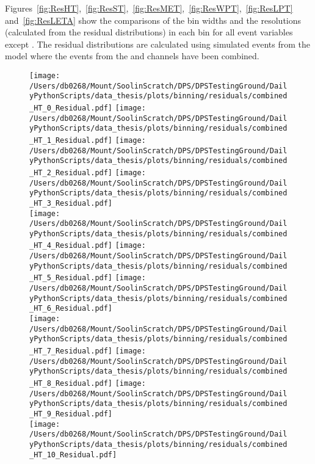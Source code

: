 Figures~\ref{fig:ResHT},~\ref{fig:ResST},~\ref{fig:ResMET},~\ref{fig:ResWPT},~\ref{fig:ResLPT} and~\ref{fig:ResLETA} show the comparisons of the bin widths and the resolutions (calculated from the residual distributions) in each bin for all event variables except \NJET{}.
The residual distributions are calculated using simulated events from the \powhegpythia{} model where the events from the \eJets{} and \muJets{} channels have been combined.

\begin{figure}[htpb]
	\centering
	\texttt{[image: /Users/db0268/Mount/SoolinScratch/DPS/DPSTestingGround/DailyPythonScripts/data\_thesis/plots/binning/residuals/combined\_HT\_0\_Residual.pdf]}
	\texttt{[image: /Users/db0268/Mount/SoolinScratch/DPS/DPSTestingGround/DailyPythonScripts/data\_thesis/plots/binning/residuals/combined\_HT\_1\_Residual.pdf]}
	\texttt{[image: /Users/db0268/Mount/SoolinScratch/DPS/DPSTestingGround/DailyPythonScripts/data\_thesis/plots/binning/residuals/combined\_HT\_2\_Residual.pdf]} 
	\texttt{[image: /Users/db0268/Mount/SoolinScratch/DPS/DPSTestingGround/DailyPythonScripts/data\_thesis/plots/binning/residuals/combined\_HT\_3\_Residual.pdf]} \\
	\texttt{[image: /Users/db0268/Mount/SoolinScratch/DPS/DPSTestingGround/DailyPythonScripts/data\_thesis/plots/binning/residuals/combined\_HT\_4\_Residual.pdf]} 
	\texttt{[image: /Users/db0268/Mount/SoolinScratch/DPS/DPSTestingGround/DailyPythonScripts/data\_thesis/plots/binning/residuals/combined\_HT\_5\_Residual.pdf]} 
	\texttt{[image: /Users/db0268/Mount/SoolinScratch/DPS/DPSTestingGround/DailyPythonScripts/data\_thesis/plots/binning/residuals/combined\_HT\_6\_Residual.pdf]} \\
	\texttt{[image: /Users/db0268/Mount/SoolinScratch/DPS/DPSTestingGround/DailyPythonScripts/data\_thesis/plots/binning/residuals/combined\_HT\_7\_Residual.pdf]}
	\texttt{[image: /Users/db0268/Mount/SoolinScratch/DPS/DPSTestingGround/DailyPythonScripts/data\_thesis/plots/binning/residuals/combined\_HT\_8\_Residual.pdf]} 
	\texttt{[image: /Users/db0268/Mount/SoolinScratch/DPS/DPSTestingGround/DailyPythonScripts/data\_thesis/plots/binning/residuals/combined\_HT\_9\_Residual.pdf]} \\
	\texttt{[image: /Users/db0268/Mount/SoolinScratch/DPS/DPSTestingGround/DailyPythonScripts/data\_thesis/plots/binning/residuals/combined\_HT\_10\_Residual.pdf]} 

\end{figure}
